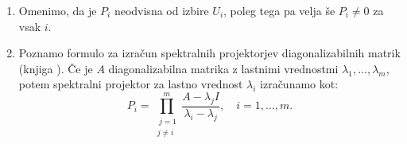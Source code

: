 \documentclass[mat1]{fmfdelo}
\begin{document}
\begin{opomba}
    \leavevmode
    \begin{enumerate}
        \item Omenimo, da je $P_i$ neodvisna od izbire $U_i$, poleg tega pa velja še $P_i \neq 0$ za vsak $i$.
        \item Poznamo formulo za izračun spektralnih projektorjev diagonalizabilnih matrik (knjiga \cite[7.~poglavje, str.~529, enačba 7.3.11]{meyer}). Če je $A$ diagonalizabilna matrika z lastnimi vrednostmi $\lambda_1, \ldots, \lambda_m$, potem spektralni projektor za lastno vrednost $\lambda_i$ izračunamo kot:
        \begin{equation}\label{spektralniProjektorjiDiag}
            P_i = \prod_{\substack{\ j=1 \\ j \neq i}}^m \frac{A-\lambda_j I}{\lambda_i-\lambda_j}, \quad i=1, \ldots, m.
        \end{equation}
    \end{enumerate}
\end{opomba}
\end{document}
